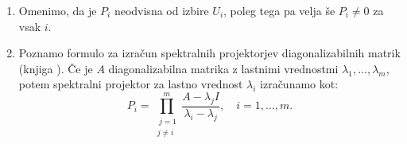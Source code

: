 \documentclass[mat1]{fmfdelo}
\begin{document}
\begin{opomba}
    \leavevmode
    \begin{enumerate}
        \item Omenimo, da je $P_i$ neodvisna od izbire $U_i$, poleg tega pa velja še $P_i \neq 0$ za vsak $i$.
        \item Poznamo formulo za izračun spektralnih projektorjev diagonalizabilnih matrik (knjiga \cite[7.~poglavje, str.~529, enačba 7.3.11]{meyer}). Če je $A$ diagonalizabilna matrika z lastnimi vrednostmi $\lambda_1, \ldots, \lambda_m$, potem spektralni projektor za lastno vrednost $\lambda_i$ izračunamo kot:
        \begin{equation}\label{spektralniProjektorjiDiag}
            P_i = \prod_{\substack{\ j=1 \\ j \neq i}}^m \frac{A-\lambda_j I}{\lambda_i-\lambda_j}, \quad i=1, \ldots, m.
        \end{equation}
    \end{enumerate}
\end{opomba}
\end{document}
